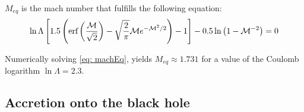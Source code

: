 			$M_{eq}$ is the mach number that fulfills the following equation:
			\begin{equation}\label{eq: machEq}
				\ln\Lambda\left[1.5\left(\text{erf}\left(\dfrac{\mathcal{M}}{\sqrt{2}}\right) - \sqrt{\dfrac{2}{\pi}}\mathcal{M}e^{-\mathcal{M}^2/2}\right) - 1\right] - 0.5\ln\left(1 - \mathcal{M}^{-2}\right) = 0
			\end{equation}
			
			Numerically solving \autoref{eq: machEq}, yields $M_{eq} \approx 1.731$ for a value of the Coulomb logarithm $\ln\Lambda = 2.3$.
		
		\subsection{Accretion onto the black hole}
	
		
	

	
%	
%	
%	
